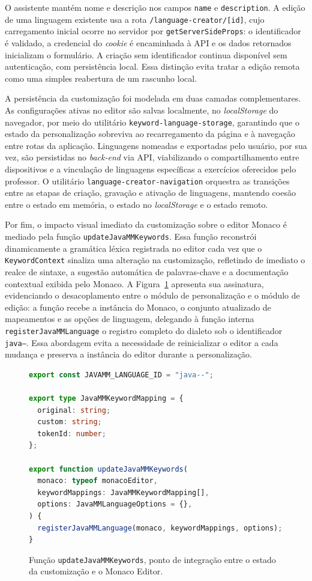O assistente mantém nome e descrição nos campos \texttt{name} e \texttt{description}. A edição de uma linguagem existente usa a rota \texttt{/language-creator/[id]}, cujo carregamento inicial ocorre no servidor por \texttt{getServerSideProps}: o identificador é validado, a credencial do \textit{cookie} é encaminhada à API e os dados retornados inicializam o formulário. A criação sem identificador continua disponível sem autenticação, com persistência local. Essa distinção evita tratar a edição remota como uma simples reabertura de um rascunho local.

A persistência da customização foi modelada em duas camadas complementares. As configurações ativas no editor são salvas localmente, no \textit{localStorage} do navegador, por meio do utilitário \texttt{keyword-language-storage}, garantindo que o estado da personalização sobreviva ao recarregamento da página e à navegação entre rotas da aplicação. Linguagens nomeadas e exportadas pelo usuário, por sua vez, são persistidas no \textit{back-end} via API, viabilizando o compartilhamento entre dispositivos e a vinculação de linguagens específicas a exercícios oferecidos pelo professor. O utilitário \texttt{language-creator-navigation} orquestra as transições entre as etapas de criação, gravação e ativação de linguagens, mantendo coesão entre o estado em memória, o estado no \textit{localStorage} e o estado remoto.

Por fim, o impacto visual imediato da customização sobre o editor Monaco é mediado pela função \texttt{updateJavaMMKeywords}. Essa função reconstrói dinamicamente a gramática léxica registrada no editor cada vez que o \texttt{KeywordContext} sinaliza uma alteração na customização, refletindo de imediato o realce de sintaxe, a sugestão automática de palavras-chave e a documentação contextual exibida pelo Monaco. A Figura~\ref{lst:update-monaco} apresenta sua assinatura, evidenciando o desacoplamento entre o módulo de personalização e o módulo de edição: a função recebe a instância do Monaco, o conjunto atualizado de mapeamentos e as opções de linguagem, delegando à função interna \texttt{registerJavaMMLanguage} o registro completo do dialeto sob o identificador \texttt{java--}. Essa abordagem evita a necessidade de reinicializar o editor a cada mudança e preserva a instância do editor durante a personalização.

\begin{figure}[htbp]
\centering
\caption{Função \texttt{updateJavaMMKeywords}, ponto de integração entre o estado da customização e o Monaco Editor.}
\label{lst:update-monaco}
\begin{lstlisting}[language=typescript]
export const JAVAMM_LANGUAGE_ID = "java--";

export type JavaMMKeywordMapping = {
  original: string;
  custom: string;
  tokenId: number;
};

export function updateJavaMMKeywords(
  monaco: typeof monacoEditor,
  keywordMappings: JavaMMKeywordMapping[],
  options: JavaMMLanguageOptions = {},
) {
  registerJavaMMLanguage(monaco, keywordMappings, options);
}
\end{lstlisting}
\end{figure}

